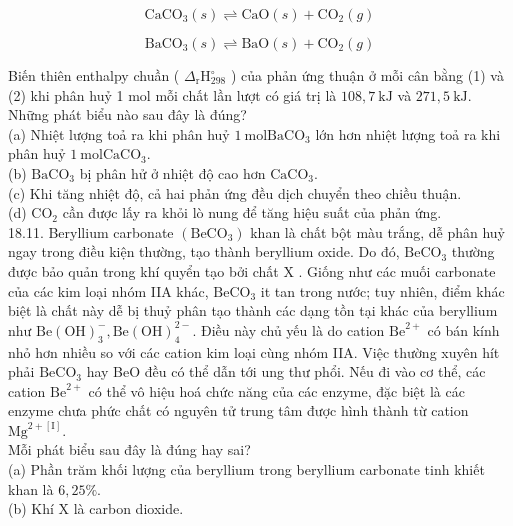 \documentclass[10pt]{article}
\begin{document}
\begin{equation*}
\mathrm{CaCO}_{3}(s) \rightleftharpoons \mathrm{CaO}(s)+\mathrm{CO}_{2}(g) \tag{1}
\end{equation*}



\begin{equation*}
\mathrm{BaCO}_{3}(s) \rightleftharpoons \mathrm{BaO}(s)+\mathrm{CO}_{2}(g) \tag{2}
\end{equation*}


Biến thiên enthalpy chuần ( $\Delta_{\mathrm{r}} \mathrm{H}_{298}^{\circ}$ ) của phản ứng thuận ở mỗi cân bằng (1) và (2) khi phân huỷ 1 mol mỗi chất lần lượt có giá trị là $108,7 \mathrm{~kJ}$ và $271,5 \mathrm{~kJ}$. Những phát biểu nào sau đây là đúng?\\
(a) Nhiệt lượng toả ra khi phân huỷ $1 \mathrm{~mol} \mathrm{BaCO}_{3}$ lớn hơn nhiệt lượng toả ra khi phân huỷ $1 \mathrm{~mol} \mathrm{CaCO}_{3}$.\\
(b) $\mathrm{BaCO}_{3}$ bị phân hử ở nhiệt độ cao hơn $\mathrm{CaCO}_{3}$.\\
(c) Khi tăng nhiệt độ, cả hai phản ứng đều dịch chuyển theo chiều thuận.\\
(d) $\mathrm{CO}_{2}$ cần được lấy ra khỏi lò nung để tăng hiệu suất của phản ứng.\\
18.11. Beryllium carbonate $\left(\mathrm{BeCO}_{3}\right)$ khan là chất bột màu trắng, dễ phân huỷ ngay trong điều kiện thường, tạo thành beryllium oxide. Do đó, $\mathrm{BeCO}_{3}$ thường được bảo quản trong khí quyển tạo bởi chất X . Giống như các muối carbonate của các kim loại nhóm IIA khác, $\mathrm{BeCO}_{3}$ it tan trong nước; tuy nhiên, điểm khác biệt là chất này dễ bị thuỷ phân tạo thành các dạng tồn tại khác của beryllium như $\mathrm{Be}(\mathrm{OH})_{3}^{-}, \mathrm{Be}(\mathrm{OH})_{4}^{2-}$. Điều này chủ yếu là do cation $\mathrm{Be}^{2+}$ có bán kính nhỏ hơn nhiều so với các cation kim loại cùng nhóm IIA. Việc thường xuyên hít phải $\mathrm{BeCO}_{3}$ hay BeO đều có thể dẫn tới ung thư phổi. Nếu đi vào cơ thể, các cation $\mathrm{Be}^{2+}$ có thể vô hiệu hoá chức năng của các enzyme, đặc biệt là các enzyme chưa phức chất có nguyên tử trung tâm được hình thành từ cation $\mathrm{Mg}^{2+[\mathrm{I}]}$.\\
Mỗi phát biểu sau đây là đúng hay sai?\\
(a) Phần trăm khối lượng của beryllium trong beryllium carbonate tinh khiết khan là $6,25 \%$.\\
(b) Khí X là carbon dioxide.\\
\end{document}

